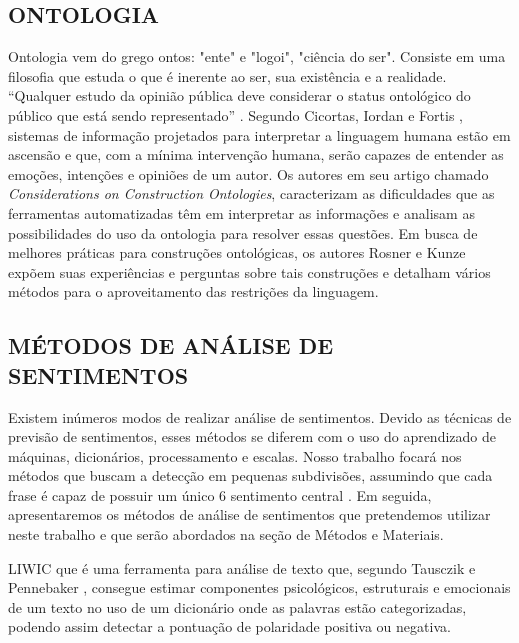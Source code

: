 \documentclass[12pt, a4paper]{article}
\begin{document}
\subsection{ONTOLOGIA}

\hspace*{0.8cm}Ontologia vem do grego ontos: "ente" e "logoi", "ciência do ser". Consiste em uma filosofia que estuda o que é inerente ao ser, sua existência e a realidade. “Qualquer estudo da opinião pública deve considerar o status ontológico do público que está sendo representado” \cite{Perrin}. Segundo Cicortas, Iordan e Fortis \citeyear{Cicortas}, sistemas de informação projetados para interpretar a linguagem humana estão em ascensão e que, com a mínima intervenção humana, serão capazes de entender as emoções, intenções e opiniões de um autor. Os autores em seu artigo chamado \textit{Considerations on Construction Ontologies}, caracterizam as dificuldades que as ferramentas automatizadas têm em interpretar as informações e analisam as possibilidades do uso da ontologia para resolver essas questões. Em busca de melhores práticas para construções ontológicas, os autores Rosner e Kunze \citeyear{Kunze} expõem suas experiências e perguntas sobre tais construções e detalham vários métodos para o aproveitamento das restrições da linguagem.

\newpage
\subsection{MÉTODOS DE ANÁLISE DE SENTIMENTOS}

\hspace*{0.8cm}Existem inúmeros modos de realizar análise de sentimentos. Devido as técnicas de previsão de sentimentos, esses métodos se diferem com o uso do aprendizado de máquinas, dicionários, processamento e escalas. Nosso trabalho focará nos métodos que buscam a detecção em pequenas subdivisões, assumindo que cada frase é capaz de possuir um único  6 sentimento central \cite{Liu}. Em seguida, apresentaremos os métodos de análise de sentimentos que pretendemos utilizar neste trabalho e que serão abordados na seção de Métodos e Materiais.

\medskip
LIWIC que é uma ferramenta para análise de texto que, segundo Tausczik e Pennebaker \citeyear{Tausczik}, consegue estimar componentes psicológicos, estruturais e emocionais de um texto no uso de um dicionário onde as palavras estão categorizadas, podendo assim detectar a pontuação de polaridade positiva ou negativa.
\end{document}
